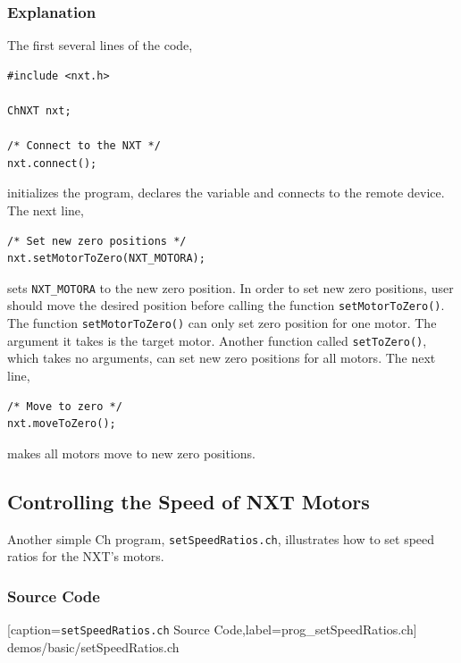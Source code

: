 \documentclass[11pt]{article}
\begin{document}
\subsubsection*{Explanation}
The first several lines of the code,
\begin{lstlisting}
#include <nxt.h>

ChNXT nxt;

/* Connect to the NXT */
nxt.connect();
\end{lstlisting}
initializes the program, declares the variable and connects to the remote device. 
The next line,
\begin{lstlisting}
/* Set new zero positions */
nxt.setMotorToZero(NXT_MOTORA);
\end{lstlisting}
sets {\tt NXT\_MOTORA} to the new zero position. In order to set new zero positions, user 
should move the desired position before calling the function {\tt setMotorToZero()}. The 
function {\tt setMotorToZero()} can only set zero position for one motor. The argument 
it takes is the target motor. Another function called {\tt setToZero()}, which takes no 
arguments, can set new zero positions for all motors. The next line,
\begin{lstlisting}
/* Move to zero */
nxt.moveToZero();
\end{lstlisting}
makes all motors move to new zero positions.

\subsection{\label{sec:speed_demo}Controlling the Speed of NXT Motors}
Another simple Ch program, {\tt setSpeedRatios.ch}, illustrates how to set speed
ratios for the NXT's motors.

\subsubsection*{Source Code}

    [caption={{\tt setSpeedRatios.ch} Source Code},label=prog_setSpeedRatios.ch]
    {demos/basic/setSpeedRatios.ch}
\end{document}
